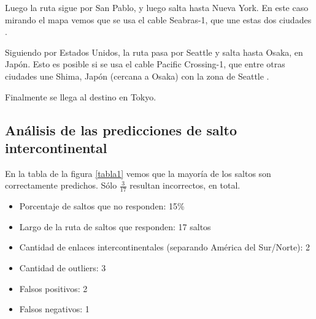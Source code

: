 Luego la ruta sigue por San Pablo, y luego salta hasta Nueva York. En este caso mirando el mapa \cite{cables} vemos que se usa el cable Seabras-1, que une estas dos ciudades \cite{seabras1}.

Siguiendo por Estados Unidos, la ruta pasa por Seattle y salta hasta Osaka, en Japón. Esto es posible si se usa el cable Pacific Crossing-1, que entre otras ciudades une Shima, Japón (cercana a Osaka) con la zona de Seattle \cite{pc1}.

Finalmente se llega al destino en Tokyo.

\subsection{Análisis de las predicciones de salto intercontinental}

En la tabla de la figura \ref{tabla1} vemos que la mayoría de los saltos son correctamente predichos. Sólo $\frac{3}{17}$ resultan incorrectos, en total.

\begin{itemize}
	\item Porcentaje de saltos que no responden: 15\%
	\item Largo de la ruta de saltos que responden: 17 saltos 
	\item Cantidad de enlaces intercontinentales (separando América del Sur/Norte): 2
	\item Cantidad de outliers: 3
	\item Falsos positivos: 2
	\item Falsos negativos: 1
\end{itemize}

